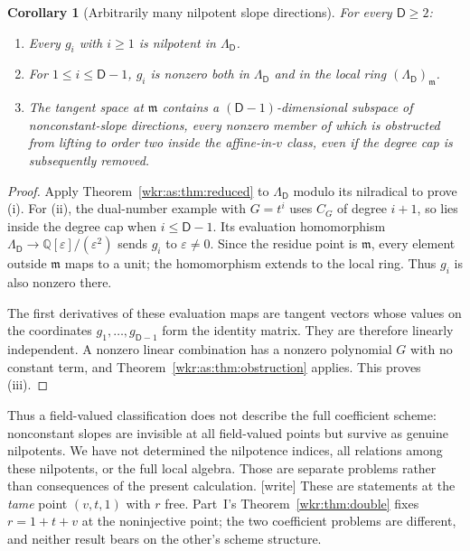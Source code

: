 \documentclass[11pt,a4paper]{article}
\numberwithin{equation}{section}
\newtheorem{corollary}[theorem]{Corollary}
\theoremstyle{definition}
\theoremstyle{remark}
\newcommand{\Q}{\mathbb{Q}}
\newcommand{\eps}{\varepsilon}
\newcommand{\Dcap}{\mathsf D}
\begin{document}
\begin{corollary}[Arbitrarily many nilpotent slope directions]
\label{wkr:as:cor:schemes}
For every $\Dcap\ge2$:
\begin{enumerate}[label=\textup{(\roman*)}]
\item Every $g_i$ with $i\ge1$ is nilpotent in $\Lambda_{\Dcap}$.
\item For $1\le i\le \Dcap-1$, $g_i$ is nonzero both in $\Lambda_{\Dcap}$
and in the local ring $(\Lambda_{\Dcap})_{\mathfrak m}$.
\item The tangent space at $\mathfrak m$ contains a
$(\Dcap-1)$-dimensional subspace of nonconstant-slope directions, every
nonzero member of which is obstructed from lifting to order two inside
the affine-in-$v$ class, even if the degree cap is subsequently removed.
\end{enumerate}
\end{corollary}
\begin{proof}
Apply Theorem~\ref{wkr:as:thm:reduced} to $\Lambda_{\Dcap}$ modulo its
nilradical to prove (i). For (ii), the dual-number example with $G=t^i$
uses $C_G$ of degree $i+1$, so lies inside the degree cap when
$i\le \Dcap-1$. Its evaluation homomorphism
$\Lambda_{\Dcap}\to\Q[\eps]/(\eps^2)$ sends $g_i$ to $\eps\ne0$. Since
the residue point is $\mathfrak m$, every element outside $\mathfrak m$
maps to a unit; the homomorphism extends to the local ring. Thus $g_i$ is
also nonzero there.

The first derivatives of these evaluation maps are tangent vectors whose
values on the coordinates $g_1,\ldots,g_{\Dcap-1}$ form the identity
matrix. They are therefore linearly independent. A nonzero linear
combination has a nonzero polynomial $G$ with no constant term, and
Theorem~\ref{wkr:as:thm:obstruction} applies. This proves (iii).
\end{proof}

Thus a field-valued classification does not describe the full coefficient
scheme: nonconstant slopes are invisible at all field-valued points but
survive as genuine nilpotents. We have not determined the nilpotence
indices, all relations among these nilpotents, or the full local algebra.
Those are separate problems rather than consequences of the present
calculation.
\textup{[write]} These are statements at the \emph{tame} point
$(v,t,1)$ with $r$ free. Part~I's Theorem~\ref{wkr:thm:double} fixes
$r=1+t+v$ at the noninjective point; the two coefficient problems are
different, and neither result bears on the other's scheme structure.
\end{document}
